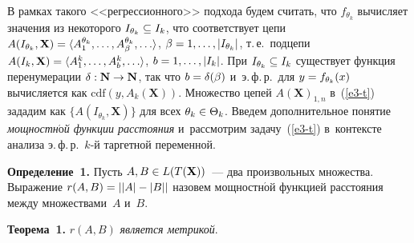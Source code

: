 \begin{multicols}{2}
     В рамках такого <<регрессионного>> подхода будем считать, что 
$f_{\theta_k}$ вычисляет значения из некоторого $I_{\theta_k}\hm\subseteq 
I_k$, что соответствует цепи ${A}(I_{\theta_k}, \mathbf{X})\hm= \langle 
A_1^{\theta_k}, \ldots, A_\beta^{\theta_k},\ldots\rangle$, $\beta \hm= 1,\ldots , \vert 
I_{\theta_k}\vert$, т.\,е.\ \mbox{подцепи} ${A}(I_k,\mathbf{X})\hm= \langle 
A_1^k, \ldots , A_b^k, \ldots \rangle$, $b\hm= 1,\ldots , \vert I_k\vert$. 
При $I_{\theta_k}\hm\subseteq I_k$ существует функция перенумерации $\delta: 
\mathbf{N}\hm\to \mathbf{N}$, так что $b\hm=\delta(\beta)$ и~э.\,ф.\,р.\ для 
$y\hm= f_{\theta_k}(x)$ вычисляется как $\mathrm{cdf}(y, 
{A}_k(\mathbf{X}))$. Множество цепей 
${A}(\mathbf{X})_{1,n}$ в~(\ref{e3-t}) зададим как 
$\{{A}(I_{\theta_k},\mathbf{X})\}$ для всех $\theta_k \hm\in \Theta_k$. 
Введем дополнительное понятие \textit{мощностн$\acute{\mbox{о}}$й функции 
расстояния} и~рассмотрим задачу~(\ref{e3-t}) в~контексте анализа  
э.\,ф.\,р.\ $k$-й таргетной переменной.
     
     \smallskip
     
     \noindent
\textbf{Определение~1.} Пусть ${A},{B}\hm\in 
L({T}(\mathbf{X}))$~--- два произвольных множества. Выражение 
$r({A}, {B})\hm=\left\vert \left\vert {A}\right\vert \hm- 
\left\vert {B}\right\vert \right\vert$ назовем мощностн$\acute{\mbox{о}}$й 
функцией расстояния между множествами~$A$ и~$B$.

\smallskip

\noindent
\textbf{Теорема~1.} $r({A}, {B})$ \textit{является метрикой}. 

\smallskip


\end{multicols}
